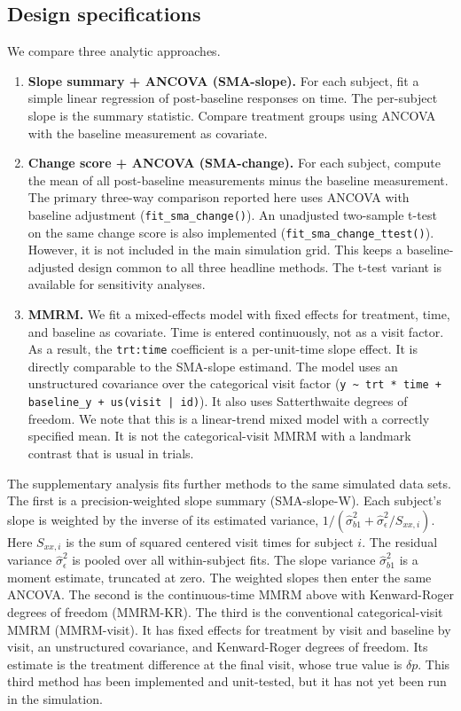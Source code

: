 \documentclass[
  11pt,
]{article}
\begin{document}
\subsection{Design specifications}\label{design-specifications}

We compare three analytic approaches.

\begin{enumerate}
\item \textbf{Slope summary + ANCOVA (SMA-slope).}
  For each subject, fit a simple linear regression of
  post-baseline responses on time. The per-subject slope is
  the summary statistic. Compare treatment groups using
  ANCOVA with the baseline measurement as covariate.

\item \textbf{Change score + ANCOVA (SMA-change).}
  For each subject, compute the mean of all post-baseline
  measurements minus the baseline measurement. The primary
  three-way comparison reported here uses ANCOVA with baseline
  adjustment (\texttt{fit\_sma\_change()}). An unadjusted
  two-sample t-test on the same change score is also
  implemented (\texttt{fit\_sma\_change\_ttest()}). However,
  it is not included in the main simulation grid. This keeps a
  baseline-adjusted design common to all three headline
  methods. The t-test variant is available for sensitivity
  analyses.

\item \textbf{MMRM.} We fit a mixed-effects model with fixed
  effects for treatment, time, and baseline as covariate. Time
  is entered continuously, not as a visit factor. As a result,
  the \texttt{trt:time} coefficient is a per-unit-time slope
  effect. It is directly comparable to the SMA-slope estimand.
  The model uses an unstructured covariance over the
  categorical visit factor (\texttt{y \textasciitilde{} trt *
  time + baseline\_y + us(visit | id)}). It also uses
  Satterthwaite degrees of freedom. We note that this is a
  linear-trend mixed model with a correctly specified mean. It
  is not the categorical-visit MMRM with a landmark contrast
  that is usual in trials.
\end{enumerate}

The supplementary analysis fits further methods to the same
simulated data sets. The first is a precision-weighted
slope summary (SMA-slope-W). Each subject's slope is weighted
by the inverse of its estimated variance,
\(1 / (\hat\sigma^2_{b1} + \hat\sigma^2_\epsilon / S_{xx,i})\).
Here \(S_{xx,i}\) is the sum of squared centered visit times for
subject \(i\). The residual variance \(\hat\sigma^2_\epsilon\) is
pooled over all within-subject fits. The slope variance
\(\hat\sigma^2_{b1}\) is a moment estimate, truncated at zero.
The weighted slopes then enter the same ANCOVA. The second is
the continuous-time MMRM above with Kenward-Roger degrees of
freedom (MMRM-KR). The third is the conventional
categorical-visit MMRM (MMRM-visit). It has fixed effects for
treatment by visit and baseline by visit, an unstructured
covariance, and Kenward-Roger degrees of freedom. Its
estimate is the treatment difference at the final visit, whose
true value is \(\delta p\). This third method has been
implemented and unit-tested, but it has not yet been run in the
simulation.
\end{document}
